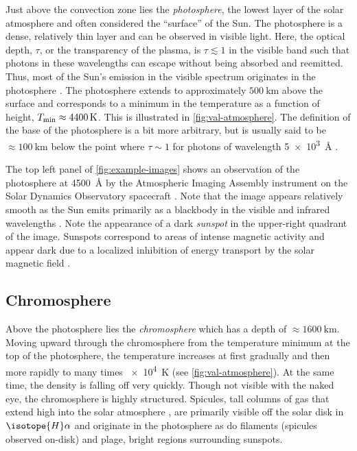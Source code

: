 Just above the convection zone lies the \textit{photosphere}, the lowest layer of the solar atmosphere and often considered the ``surface'' of the Sun. The photosphere is a dense, relatively thin layer and can be observed in visible light. Here, the optical depth, $\tau$, or the transparency of the plasma, is $\tau\lesssim1$ in the visible band such that photons in these wavelengths can escape without being absorbed and reemitted. Thus, most of the Sun's emission in the visible spectrum originates in the photosphere \citep{priest_magnetohydrodynamics_2014}. The photosphere extends to approximately $\SI{500}{\km}$ above the surface and corresponds to a minimum in the temperature as a function of height, $T_\textup{min}\approx\SI{4400}{\kelvin}$. This is illustrated in \autoref{fig:val-atmosphere}. The definition of the base of the photosphere is a bit more arbitrary, but is usually said to be $\approx\SI{100}{\km}$ below the point where $\tau\sim1$ for photons of wavelength \SI{5e3}{\angstrom} \citep{carroll_introduction_2007}. 

The top left panel of \autoref{fig:example-images} shows an observation of the photosphere at \SI{4500}{\angstrom} by the Atmospheric Imaging Assembly instrument \citep[AIA,][]{lemen_atmospheric_2012} on the Solar Dynamics Observatory spacecraft \citep[SDO,][]{pesnell_solar_2012}. Note that the image appears relatively smooth as the Sun emits primarily as a blackbody in the visible and infrared wavelengths \citep{carroll_introduction_2007}. Note the appearance of a dark \textit{sunspot} in the upper-right quadrant of the image. Sunspots correspond to areas of intense magnetic activity and appear dark due to a localized inhibition of energy transport by the solar magnetic field \citep{priest_magnetohydrodynamics_2014}.

\subsection{Chromosphere}\label{sec:chromosphere}

Above the photosphere lies the \textit{chromosphere} which has a depth of $\approx\SI{1600}{\km}$. Moving upward through the chromosphere from the temperature minimum at the top of the photosphere, the temperature increases at first gradually and then more rapidly to many times \SI{e4}{\kelvin} (see \autoref{fig:val-atmosphere}). At the same time, the density is falling off very quickly. Though not visible with the naked eye, the chromosphere is highly structured. Spicules, tall columns of gas that extend high into the solar atmosphere \citep{de_pontieu_origins_2011}, are primarily visible off the solar disk in $\isotope{H}\alpha$ and originate in the photosphere as do filaments (spicules observed on-disk) and plage, bright regions surrounding sunspots.

